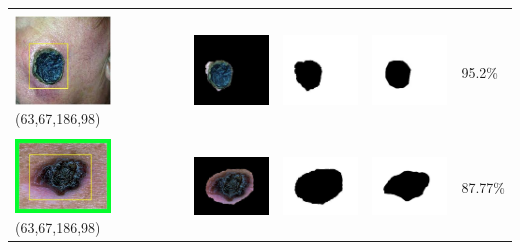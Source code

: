 \begin{table}[H]
\begin{tabular}{|m{1.0in}|m{1.0in}|m{1.0in}|m{1.0in}|m{0.6in}|}
		&  &  & \\
		\includegraphics[width=1.0in]{gambar/hasil_segmentasi/luka_hitam/image_28_rect.jpg} {\centering\fontsize{10}{10}\selectfont(63,67,186,98)}&
		\includegraphics[width=1.0in]{gambar/hasil_segmentasi/luka_hitam/result_28.jpg}&
		\includegraphics[width=1.0in]{gambar/hasil_segmentasi/luka_hitam/mask_r_28.jpg}&
		\includegraphics[width=1.0in]{gambar/hasil_segmentasi/luka_hitam/28_r.jpg}&
		95.2\% \\
		\hline 

		&  &  & \\
		\includegraphics[width=1.0in]{gambar/hasil_segmentasi/luka_hitam/image_29_rect.jpg} {\centering\fontsize{10}{10}\selectfont(63,67,186,98)}&
		\includegraphics[width=1.0in]{gambar/hasil_segmentasi/luka_hitam/result_29.jpg}&
		\includegraphics[width=1.0in]{gambar/hasil_segmentasi/luka_hitam/mask_r_29.jpg}&
		\includegraphics[width=1.0in]{gambar/hasil_segmentasi/luka_hitam/29_r.jpg}&
		87.77\% \\
		\hline 


\end{tabular}
\end{table}
